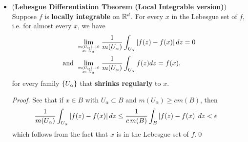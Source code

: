 \documentclass[11pt]{article}
\begin{document}
\begin{itemize}
\item \begin{theorem}(\textbf{Lebesgue Differentiation Theorem (Local Integrable version)}) \citep{stein2009real, folland2013real}\\
Suppose $f$ is \textbf{locally integrable} on ${\mathbb R}^{d}$. For every $x$ in the Lebesgue set of $f$, i.e. for almost every $x$, we have 
\begin{align*}
&\lim\limits_{m(U_{\alpha})\rightarrow 0\atop x\in U_{\alpha}}\frac{1}{m(U_{\alpha})}\int_{U_{\alpha}}\left\lvert f(z) - f(x) \right\rvert dz = 0\\
\text{and }&\lim\limits_{m(U_{\alpha})\rightarrow 0\atop x\in U_{\alpha}}\frac{1}{m(U_{\alpha})}\int_{U_{\alpha}}f(z) dz = f(x),
\end{align*}
for every family $\left\{U_{\alpha}\right\}$ that \textbf{shrinks regularly} to $x$.
\end{theorem}
\begin{proof}
See that if $x\in B$ with $U_{\alpha} \subset B$ and $m(U_{\alpha})\ge c m(B)$, then 
\begin{align*}
\frac{1}{m(U_{\alpha})}\int_{U_{\alpha}}\left\lvert f(z) - f(x) \right\rvert dz&\le \frac{1}{c \,m(B)}\int_{B}\left\lvert f(z) - f(x) \right\rvert dz<\epsilon
\end{align*} which follows from the fact that $x$ is in the Lebesgue set of $f$.\qed
\end{proof}
\end{itemize}
\end{document}
